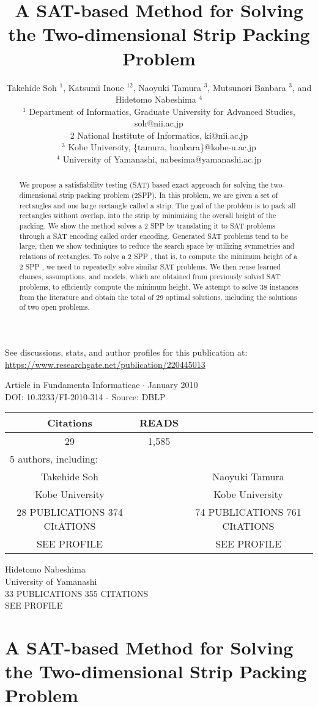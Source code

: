 \documentclass[10pt]{article}
\title{A SAT-based Method for Solving the Two-dimensional Strip Packing Problem }
\author{Takehide Soh ${ }^{1}$, Katsumi Inoue ${ }^{12}$, Naoyuki Tamura ${ }^{3}$, Mutsunori Banbara ${ }^{3}$, and Hidetomo Nabeshima ${ }^{4}$\\
${ }^{1}$ Department of Informatics, Graduate University for Advanced Studies, soh@nii.ac.jp\\
2 National Institute of Informatics, ki@nii.ac.jp\\
${ }^{3}$ Kobe University, \{tamura, banbara\}@kobe-u.ac.jp\\
${ }^{4}$ University of Yamanashi, nabesima@yamanashi.ac.jp}
\date{}
\begin{document}
\maketitle
See discussions, stats, and author profiles for this publication at: \href{https://www.researchgate.net/publication/220445013}{https://www.researchgate.net/publication/220445013}

Article in Fundamenta Informaticae $\cdot$ January 2010\\
DOI: 10.3233/FI-2010-314 - Source: DBLP

\begin{center}
\begin{tabular}{|c|c|c|}
\hline
Citations & READS &  \\
\hline
29 & 1,585 &  \\
\hline
\multicolumn{3}{|l|}{5 authors, including:} \\
\hline
Takehide Soh &  & Naoyuki Tamura \\
\hline
Kobe University &  & Kobe University \\
\hline
28 PUBLICATIONS 374 CItATIONS &  & 74 PUBLICATIONS 761 CItATIONS \\
\hline
SEE PROFILE &  & SEE PROFILE \\
\hline
\end{tabular}
\end{center}

Hidetomo Nabeshima\\
University of Yamanashi\\
33 PUBLICATIONS 355 CITATIONS\\
SEE PROFILE

\section*{A SAT-based Method for Solving the Two-dimensional Strip Packing Problem }


\begin{abstract}
We propose a satisfiability testing (SAT) based exact approach for solving the two-dimensional strip packing problem (2SPP). In this problem, we are given a set of rectangles and one large rectangle called a strip. The goal of the problem is to pack all rectangles without overlap, into the strip by minimizing the overall height of the packing. We show the method solves a 2 SPP by translating it to SAT problems through a SAT encoding called order encoding. Generated SAT problems tend to be large, then we show techniques to reduce the search space by utilizing symmetries and relations of rectangles. To solve a 2 SPP , that is, to compute the minimum height of a 2 SPP , we need to repeatedly solve similar SAT problems. We then reuse learned clauses, assumptions, and models, which are obtained from previously solved SAT problems, to efficiently compute the minimum height. We attempt to solve 38 instances from the literature and obtain the total of 29 optimal solutions, including the solutions of two open problems.
\end{abstract}
\end{document}

